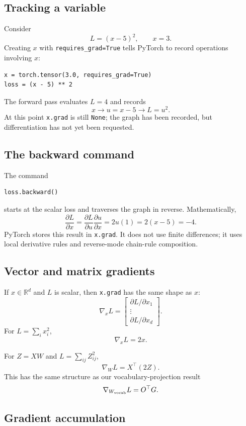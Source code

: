 \documentclass[11pt]{article}
\newcommand{\R}{\mathbb{R}}
\newcommand{\grad}{\nabla}
\begin{document}
\subsection{Tracking a variable}

Consider
\[
L=(x-5)^2,\qquad x=3.
\]
Creating $x$ with \texttt{requires\_grad=True} tells PyTorch to record operations involving $x$:
\begin{lstlisting}
x = torch.tensor(3.0, requires_grad=True)
loss = (x - 5) ** 2
\end{lstlisting}
The forward pass evaluates $L=4$ and records
\[
x\longrightarrow u=x-5\longrightarrow L=u^2.
\]
At this point \texttt{x.grad} is still \texttt{None}; the graph has been recorded, but differentiation has
not yet been requested.

\subsection{The backward command}

The command
\begin{lstlisting}
loss.backward()
\end{lstlisting}
starts at the scalar loss and traverses the graph in reverse. Mathematically,
\[
\frac{\partial L}{\partial x}
=\frac{\partial L}{\partial u}\frac{\partial u}{\partial x}
=2u(1)=2(x-5)=-4.
\]
PyTorch stores this result in \texttt{x.grad}. It does not use finite differences; it uses local derivative
rules and reverse-mode chain-rule composition.

\subsection{Vector and matrix gradients}

If $x\in\R^d$ and $L$ is scalar, then \texttt{x.grad} has the same shape as $x$:
\[
\grad_xL=
\begin{bmatrix}
\partial L/\partial x_1\\
\vdots\\
\partial L/\partial x_d
\end{bmatrix}.
\]
For $L=\sum_i x_i^2$,
\[
\grad_xL=2x.
\]

For $Z=XW$ and $L=\sum_{ij}Z_{ij}^2$,
\[
\grad_WL=X^\top(2Z).
\]
This has the same structure as our vocabulary-projection result
\[
\grad_{W_{\rm vocab}}L=O^\top G.
\]

\subsection{Gradient accumulation}
\end{document}
